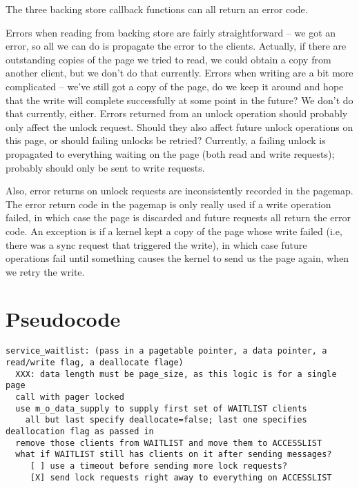 \documentclass{article}
\begin{document}
The three backing store callback functions can all return an error
code.

Errors when reading from backing store are fairly straightforward --
we got an error, so all we can do is propagate the error to the
clients.  Actually, if there are outstanding copies of the page we
tried to read, we could obtain a copy from another client, but we
don't do that currently.  Errors when writing are a bit more
complicated -- we've still got a copy of the page, do we keep it
around and hope that the write will complete successfully at some
point in the future?  We don't do that currently, either.  Errors
returned from an unlock operation should probably only affect the
unlock request.  Should they also affect future unlock operations on
this page, or should failing unlocks be retried?  Currently, a failing
unlock is propagated to everything waiting on the page (both read and
write requests); probably should only be sent to write requests.

Also, error returns on unlock requests are inconsistently recorded in
the pagemap.  The error return code in the pagemap is only really used
if a write operation failed, in which case the page is discarded and
future requests all return the error code.  An exception is if a
kernel kept a copy of the page whose write failed (i.e, there was a
sync request that triggered the write), in which case future
operations fail until something causes the kernel to send us the page
again, when we retry the write.


\section{Pseudocode}

\begin{verbatim}
service_waitlist: (pass in a pagetable pointer, a data pointer, a read/write flag, a deallocate flage)
  XXX: data length must be page_size, as this logic is for a single page
  call with pager locked
  use m_o_data_supply to supply first set of WAITLIST clients
    all but last specify deallocate=false; last one specifies deallocation flag as passed in
  remove those clients from WAITLIST and move them to ACCESSLIST
  what if WAITLIST still has clients on it after sending messages?
     [ ] use a timeout before sending more lock requests?
     [X] send lock requests right away to everything on ACCESSLIST
\end{verbatim}
\end{document}
